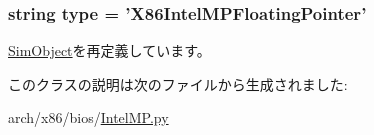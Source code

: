 \hypertarget{classIntelMP_1_1X86IntelMPFloatingPointer_acce15679d830831b0bbe8ebc2a60b2ca}{
\subsubsection[{type}]{\setlength{\rightskip}{0pt plus 5cm}string {\bf type} = '{\bf X86IntelMPFloatingPointer}'}}
\label{classIntelMP_1_1X86IntelMPFloatingPointer_acce15679d830831b0bbe8ebc2a60b2ca}


\hyperlink{classm5_1_1SimObject_1_1SimObject_acce15679d830831b0bbe8ebc2a60b2ca}{SimObject}を再定義しています。

このクラスの説明は次のファイルから生成されました:\begin{DoxyCompactItemize}
\item 
arch/x86/bios/\hyperlink{IntelMP_8py}{IntelMP.py}\end{DoxyCompactItemize}
